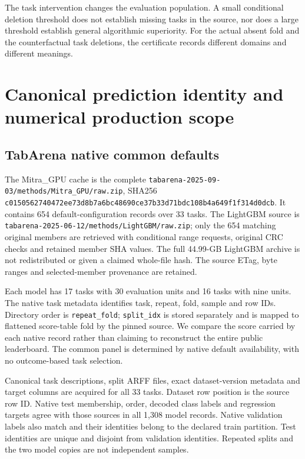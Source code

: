 The task intervention changes the evaluation population. A small conditional deletion threshold does not establish missing tasks in the source, nor does a large threshold establish general algorithmic superiority. For the actual absent fold and the counterfactual task deletions, the certificate records different domains and different meanings.

\section{Canonical prediction identity and numerical production scope}\label{sec:s20}
\subsection{TabArena native common defaults}
The Mitra\_GPU cache is the complete \nolinkurl{tabarena-2025-09-03/methods/Mitra_GPU/raw.zip}, SHA256 \nolinkurl{c0150562740472ee73d8b7a6bc48690ce37b33d71bdc108b4a649f1f314d0dcb}. It contains 654 default-configuration records over 33 tasks. The LightGBM source is \nolinkurl{tabarena-2025-06-12/methods/LightGBM/raw.zip}; only the 654 matching original members are retrieved with conditional range requests, original CRC checks and retained member SHA values. The full 44.99-GB LightGBM archive is not redistributed or given a claimed whole-file hash. The source ETag, byte ranges and selected-member provenance are retained.

Each model has 17 tasks with 30 evaluation units and 16 tasks with nine units. The native task metadata identifies task, repeat, fold, sample and row IDs. Directory order is \texttt{repeat\_fold}; \texttt{split\_idx} is stored separately and is mapped to flattened score-table fold by the pinned source. We compare the score carried by each native record rather than claiming to reconstruct the entire public leaderboard. The common panel is determined by native default availability, with no outcome-based task selection.

Canonical task descriptions, split ARFF files, exact dataset-version metadata and target columns are acquired for all 33 tasks. Dataset row position is the source row ID. Native test membership, order, decoded class labels and regression targets agree with those sources in all 1,308 model records. Native validation labels also match and their identities belong to the declared train partition. Test identities are unique and disjoint from validation identities. Repeated splits and the two model copies are not independent samples.

